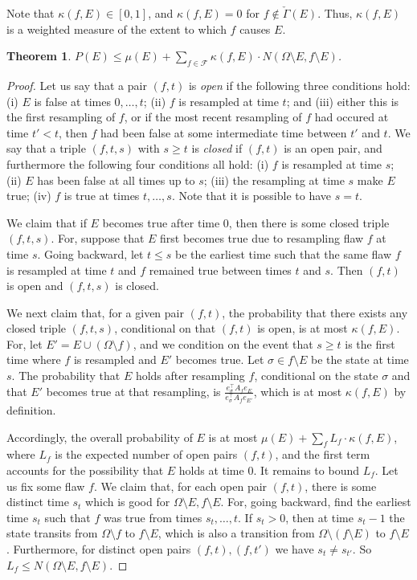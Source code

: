 \documentclass[11pt]{article}
\newtheorem{theorem}{Theorem}[section]
\begin{document}
Note that $\kappa(f, E) \in [0,1]$, and $\kappa(f,E) = 0$ for $f \notin \check \Gamma(E)$. Thus, $\kappa(f, E)$ is a weighted measure of the extent to which $f$ causes $E$.  


\begin{theorem}
\label{distthm1e} 
$P(E) \leq \mu(E) +  \sum_{f \in \mathcal F}  \kappa(f, E) \cdot N (\Omega \setminus E, f \setminus E)$.
\end{theorem}
\begin{proof}
Let us say that a pair $(f,t)$ is \emph{open} if the following three conditions hold: (i) $E$ is false at times $0, \dots, t$; (ii) $f$ is resampled at time $t$; and (iii) either this is the first resampling of $f$, or if the most recent resampling of $f$ had occured at time $t' < t$, then $f$ had been false at some intermediate time between $t'$ and $t$.  We say that a triple $(f,t,s)$ with $s \geq t$ is \emph{closed} if $(f,t)$ is an open pair, and furthermore the following four conditions  all hold: (i) $f$ is resampled at time $s$; (ii) $E$ has been false at all times up to $s$; (iii) the resampling at time $s$ make $E$ true; (iv) $f$ is true at times $t, \dots, s$. Note that it is possible to have $s = t$.

We claim that if $E$ becomes true after time 0, then there is some closed triple $(f,t,s)$. For, suppose that $E$ first becomes true due to resampling flaw $f$ at time $s$. Going backward, let $t \leq s$ be the earliest time such that the same flaw $f$ is resampled at time $t$ and $f$ remained true between times $t$ and $s$. Then $(f,t)$ is open and $(f,t,s)$ is closed.

We next claim that, for a given pair $(f,t)$, the probability that there exists any closed triple $(f,t,s)$, conditional on that $(f,t)$ is open, is at most $\kappa(f,E)$. For, let $E' = E \cup (\Omega \setminus f)$, and we condition on the event that $s \geq t$ is the first time where  $f$ is resampled and $E'$ becomes true. Let $\sigma \in f \setminus E$ be the state at time $s$. The probability that $E$ holds after resampling $f$, conditional on the state $\sigma$ and that $E'$ becomes true at that resampling,  is $\frac{ e_{\sigma}^{\top} A_f e_{E}  }{e_{\sigma}^{\top} A_f e_{E'}}$, which is at most $\kappa(f,E)$ by definition.

Accordingly, the overall probability of  $E$ is at most $\mu(E) + \sum_f L_f \cdot \kappa(f, E)$, where $L_f$ is the expected number of open pairs $(f,t)$, and the first term accounts for the possibility that $E$ holds at time 0. It remains to bound $L_f$. Let us fix some flaw $f$. We claim that, for each open pair $(f,t)$, there is some distinct time $s_t$ which is good for $\Omega \setminus E,  f \setminus E$. For, going backward, find the earliest time $s_t$ such that $f$ was true from times $s_t, \dots, t$.  If $s_t > 0$, then at time $s_t - 1$ the state transits from $\Omega \setminus f$ to $f \setminus E$, which is also a transition from $\Omega \setminus (f \setminus E)$ to $f \setminus E$. Furthermore, for distinct open pairs $(f,t), (f,t')$ we have $s_t \neq s_{t'}$. So  $L_f \leq N(\Omega \setminus E, f \setminus E)$.
\end{proof}
\end{document}
